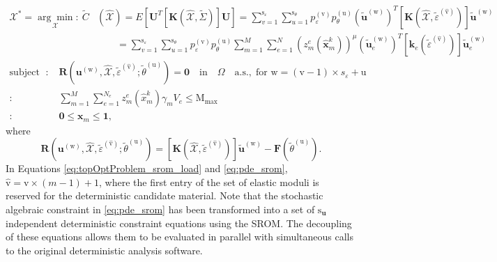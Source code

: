 \begin{equation*}
\begin{aligned}
\mathcal{X}^{\ast}=\underset{\mathcal{X}}{\arg\min}  : \ \tilde{C}& (\widehat{\mathcal{X}}) = E \left[ \bm U^T [\bm K(\widehat{\mathcal{X}},\tilde\Sigma)] \bm U \right] = \sum_{v=1}^{\mathrm{s}_{\varepsilon}}\sum_{u=1}^{\mathrm{s}_{\theta}}p_{\varepsilon}^{(\mathrm{v})} p_{\theta}^{(\mathrm{u})} (\tilde{\bm u}^{(\mathrm{w})})^T [\bm K(\widehat{\mathcal{X}}, \tilde\varepsilon^{(\hat{\mathrm{v}})})]   \tilde{\bm u}^{(\mathrm{w})} 
\\
& \qquad = \sum_{v=1}^{\mathrm{s}_{\varepsilon}} \sum_{u=1}^{\mathrm{s}_{\theta}}p_{\varepsilon}^{(\mathrm{v})} p_{\theta}^{(\mathrm{u})} \sum_{m=1}^{M} \sum_{e=1}^N (z_m^e(\hat{\bm x}_m^k))^{\mu} (\tilde{\bm u}_e^{(\mathrm{w})})^T [\bm k_e(\tilde\varepsilon^{(\hat{\mathrm{v}})})]  \tilde{\bm u}_e^{(\mathrm{w})} 
\end{aligned} 
\end{equation*}
\begin{equation}
\label{eq:topOptProblem_srom_load}
\begin{aligned}
\text{subject to } : & \;\; \bm{R} (\bm u^{(\mathrm{w})}, \widehat{\mathcal{X}}, \tilde\varepsilon^{(\hat{\mathrm{v}})};  \tilde{\theta}^{(\mathrm{u})}) = \bm 0 \quad\mbox{in}\quad\Omega\quad\mbox{a.s.}, \; \text{for } \mathrm{w} = (\mathrm{v}-1)\times{s}_{\varepsilon}+\mathrm{u} 
\\
			 :  & \;\; \sum_{m=1}^{M}\sum_{e=1}^{N_e}z_m^e(\hat{x}_m^k)\gamma_m V_e \leq \mathrm{M}_{\max} \\
			 : & \;\; \bm 0 \leq \bm x_m \leq \bm 1,
\end{aligned} 
\end{equation}
where 
\begin{equation}
\label{eq:pde_srom}
\bm{R}(\bm u^{(\mathrm{w})}, \widehat{\mathcal{X}}, \tilde\varepsilon^{(\hat{\mathrm{v}})}; \tilde{\theta}^{(\mathrm{u})}) = [\bm K(\widehat{\mathcal{X}}, \tilde\varepsilon^{(\hat{\mathrm{v}})})] \tilde{\bm u}^{(\mathrm{w})} - \bm{\bm F}(\tilde\theta^{(\mathrm{u})}).
\end{equation}
In Equations \eqref{eq:topOptProblem_srom_load} and \eqref{eq:pde_srom}, $\hat{\mathrm{v}}=\mathrm{v}\times(m-1) + 1$, where the first entry of the set of elastic moduli is reserved for the deterministic candidate material. Note that the stochastic algebraic constraint in \eqref{eq:pde_srom} has been transformed into a set of $\mathrm{s}_{\bm u}$ independent deterministic constraint equations using the SROM. The decoupling of these equations allows them to be evaluated in parallel with simultaneous calls to the original deterministic analysis software. 

